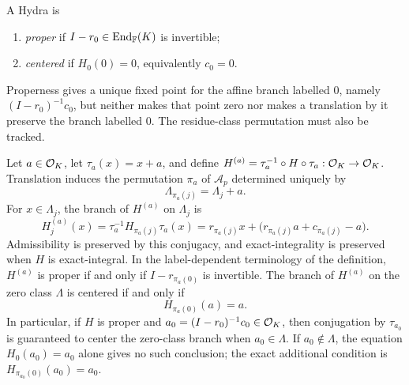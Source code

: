 \begin{definition}
A Hydra is
\begin{enumerate}[label=\textup{(\roman*)}]
\item \emph{proper} if $I-r_0\in\operatorname{End}_\mathbb F(K)$ is invertible;
\item \emph{centered} if $H_0(0)=0$, equivalently $c_0=0$.
\end{enumerate}
\end{definition}

Properness gives a unique fixed point for the affine branch labelled $0$,
namely $(I-r_0)^{-1}c_0$, but neither makes that point zero nor makes a
translation by it preserve the branch labelled $0$.  The residue-class
permutation must also be tracked.

\begin{proposition}
\label{prop:translation-conjugacy-cosets}
Let $a\in\mathcal O_K$, let $\tau_a(x)=x+a$, and define
$H^{(a)}=\tau_a^{-1}\circ H\circ\tau_a:\mathcal O_K\to\mathcal O_K$.  Translation induces the
permutation $\pi_a$ of $\mathcal A_p$ determined uniquely by
\begin{equation}
\label{eq:translation-coset-permutation}
 \Lambda_{\pi_a(j)}=\Lambda_j+a.
\end{equation}
For $x\in\Lambda_j$, the branch of $H^{(a)}$ on $\Lambda_j$ is
\begin{equation}
\label{eq:translated-Hydra-branch}
 H^{(a)}_j(x)
 =\tau_a^{-1}H_{\pi_a(j)}\tau_a(x)
 =r_{\pi_a(j)}x+
   \bigl(r_{\pi_a(j)}a+c_{\pi_a(j)}-a\bigr).
\end{equation}
Admissibility is preserved by this conjugacy, and exact-integrality is
preserved when $H$ is exact-integral.  In the label-dependent terminology of
the definition, $H^{(a)}$ is proper if and only if
$I-r_{\pi_a(0)}$ is invertible.  The branch of $H^{(a)}$ on the zero class
$\Lambda$ is
centered if and only if
\begin{equation}
\label{eq:translation-centering-condition}
 H_{\pi_a(0)}(a)=a.
\end{equation}
In particular, if $H$ is proper and
$a_0=(I-r_0)^{-1}c_0\in\mathcal O_K$, then conjugation by $\tau_{a_0}$ is guaranteed
to center the zero-class branch when $a_0\in\Lambda$.  If
$a_0\notin\Lambda$, the equation $H_0(a_0)=a_0$ alone gives no such
conclusion; the exact additional condition is
$H_{\pi_{a_0}(0)}(a_0)=a_0$.
\end{proposition}

